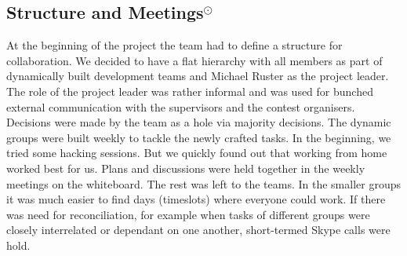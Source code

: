 \subsection{Structure and Meetings$^\odot$}
At the beginning of the project the team had to define a structure for collaboration. We decided to have a flat hierarchy with all members as part of dynamically built development teams and Michael Ruster as the project leader. The role of the project leader was rather informal and was used for bunched external communication with the supervisors and the contest organisers. Decisions were made by the team as a hole via majority decisions. The dynamic groups were built weekly to tackle the newly crafted tasks. In the beginning, we tried some hacking sessions. But we quickly found out that working from home worked best for us. Plans and discussions were held together in the weekly meetings on the whiteboard. The rest was left to the teams. In the smaller groups it was much easier to find days (timeslots) where everyone could work. If there was need for reconciliation, for example when tasks of different groups were closely interrelated or dependant on one another, short-termed Skype calls were hold. 

